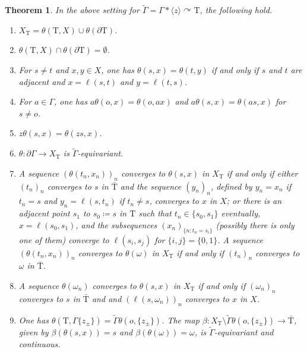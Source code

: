 \documentclass[12pt,nosumlimits,nonamelimits]{amsart}
\newtheorem{thm}{Theorem}
\theoremstyle{remark}
\theoremstyle{definition}
\newcommand{\Ga}{\Gamma}
\newcommand{\Tree}{\mathrm{T}}
\newcommand{\acts}{\curvearrowright}
\newcommand{\ip}[1]{\mathopen{\langle}#1\mathclose{\rangle}}
\begin{document}
\begin{thm}\label{thm:space}
In the above setting for $\tilde{\Ga}=\Ga*\ip{z}\acts\Tree$, the following hold.
\begin{enumerate}
\item\label{p1}
$X_\Tree = \theta(\Tree,X) \cup \theta(\partial\Tree)$.
\item\label{p2}
$\theta(\Tree,X) \cap \theta(\partial\Tree) = \emptyset$.
\item\label{p3}
For $s\neq t$ and $x,y\in X$, 
one has $\theta(s,x)=\theta(t,y)$ if and only if 
$s$ and $t$ are adjacent and $x=\ell(s,t)$ and $y=\ell(t,s)$. 
\item\label{p4}
For $a\in\Ga$, one has 
$a\theta(o,x)=\theta(o,ax)$ and $a\theta(s,x)=\theta(as,x)$ 
for $s\neq o$.
\item\label{p5}
$z\theta(s,x)=\theta(zs,x)$. 
\item\label{p6}
$\theta\colon \partial\Ga\to X_\Tree$ is $\tilde{\Ga}$-equivariant.
\item\label{p7}
A sequence $(\theta(t_n,x_n))_n$ 
converges to $\theta(s,x)$ in $X_\Tree$ if and only if 
either 
$(t_n)_n$ converges to $s$ in $\bar{\Tree}$ and 
the sequence $(y_n)_n$, defined by 
$y_n= x_n$ if $t_n=s$ and $y_n = \ell(s,t_n)$ if $t_n\neq s$,
converges to $x$ in $X$; 
or there is an adjacent point $s_1$ to $s_0 \coloneq s$ in $\Tree$ 
such that $t_n\in\{s_0,s_1\}$ eventually, $x=\ell(s_0,s_1)$, 
and the subsequences $(x_n)_{\{n : t_n=s_i\}}$ 
(possibly there is only one of them) converge 
to $\ell(s_i,s_j)$ for $\{i,j\}=\{0,1\}$.  
A sequence $(\theta(t_n,x_n))_n$ 
converges to $\theta(\omega)$ in $X_\Tree$ if and only if 
$(t_n)_n$ converges to $\omega$ in $\bar{\Tree}$.
\item\label{p8}
A sequence $\theta(\omega_n)$ 
converges to $\theta(s,x)$ in $X_\Tree$ if and only if 
$(\omega_n)_n$ converges to $s$ in $\bar{\Tree}$ and 
and $(\ell(s,\omega_n))_n$ converges to $x$ in $X$.
\item\label{p9}
One has 
$\theta(\Tree,\Ga\{z_\pm\})=\tilde{\Ga}\theta(o,\{z_\pm\})$. 
The map 
$\beta\colon X_\Tree \setminus \tilde{\Ga}\theta(o,\{z_\pm\}) 
\to\bar{\Tree}$, given by $\beta(\theta(s,x))=s$ and $\beta(\theta(\omega))=\omega$, is 
$\tilde{\Ga}$-equivariant and continuous. 
\end{enumerate}
\end{thm}
\end{document}
